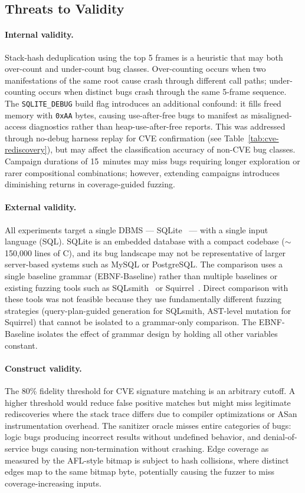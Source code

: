 \subsection{Threats to Validity}
\label{sec:threats}

\paragraph{Internal validity.}
Stack-hash deduplication using the top 5 frames is a heuristic that may both over-count and under-count bug classes. Over-counting occurs when two manifestations of the same root cause crash through different call paths; under-counting occurs when distinct bugs crash through the same 5-frame sequence. The \texttt{SQLITE\_DEBUG} build flag introduces an additional confound: it fills freed memory with \texttt{0xAA} bytes, causing use-after-free bugs to manifest as misaligned-access diagnostics rather than heap-use-after-free reports. This was addressed through no-debug harness replay for CVE confirmation (see Table~\ref{tab:cve-rediscovery}), but may affect the classification accuracy of non-CVE bug classes. Campaign durations of 15~minutes may miss bugs requiring longer exploration or rarer compositional combinations; however, extending campaigns introduces diminishing returns in coverage-guided fuzzing.

\paragraph{External validity.}
All experiments target a single DBMS --- SQLite~\citep{sqlite} --- with a single input language (SQL). SQLite is an embedded database with a compact codebase (${\sim}$150{,}000 lines of C), and its bug landscape may not be representative of larger server-based systems such as MySQL or PostgreSQL. The comparison uses a single baseline grammar (EBNF-Baseline) rather than multiple baselines or existing fuzzing tools such as SQLsmith~\citep{sqlsmith} or Squirrel~\citep{squirrel}. Direct comparison with these tools was not feasible because they use fundamentally different fuzzing strategies (query-plan-guided generation for SQLsmith, AST-level mutation for Squirrel) that cannot be isolated to a grammar-only comparison. The EBNF-Baseline isolates the effect of grammar design by holding all other variables constant.

\paragraph{Construct validity.}
The 80\% fidelity threshold for CVE signature matching is an arbitrary cutoff. A higher threshold would reduce false positive matches but might miss legitimate rediscoveries where the stack trace differs due to compiler optimizations or ASan instrumentation overhead. The sanitizer oracle misses entire categories of bugs: logic bugs producing incorrect results without undefined behavior, and denial-of-service bugs causing non-termination without crashing. Edge coverage as measured by the AFL-style bitmap is subject to hash collisions, where distinct edges map to the same bitmap byte, potentially causing the fuzzer to miss coverage-increasing inputs.

